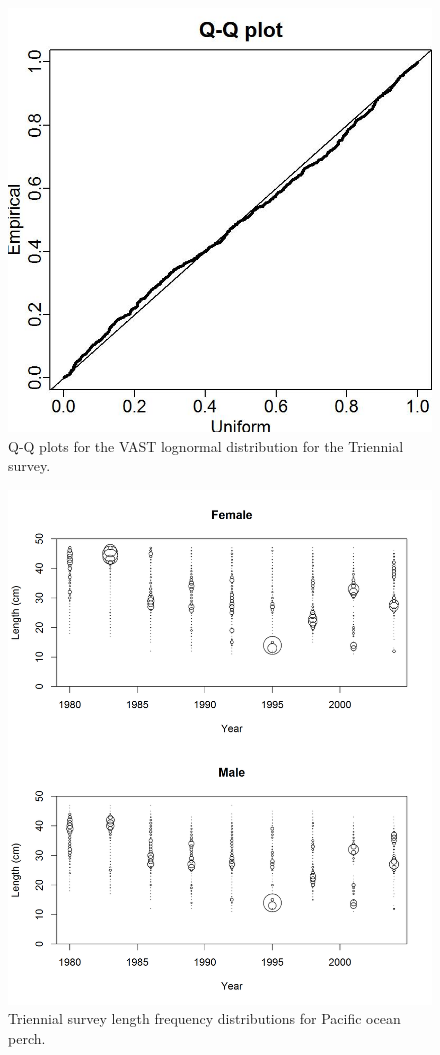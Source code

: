 \documentclass[12pt,]{article}
\begin{document}
\begin{figure}
\centering
\includegraphics{Figures/Q-Q_plot_triennial.jpg}
\caption{Q-Q plots for the VAST lognormal distribution for the Triennial
survey. \label{fig:tri_qq}}
\end{figure}

\FloatBarrier

\begin{figure}
\centering
\includegraphics{Figures/Triennial_Lengths.png}
\caption{Triennial survey length frequency distributions for Pacific
ocean perch. \label{fig:Tri_Length}}
\end{figure}
\end{document}
